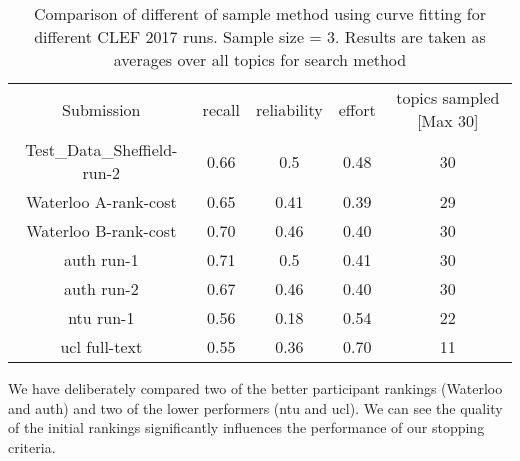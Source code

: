 \begin{table}[H]
\centering
\begin{tabular}{|c|c|c|c|c|} 

 \hline
 Submission & recall & reliability & effort & topics sampled [Max 30]  \\ 
 Test\_Data\_Sheffield-run-2 & 0.66 &	0.5	&	0.48 & 30 \\ 
 Waterloo A-rank-cost & 0.65 & 0.41	&	0.39 & 29 \\ 
 Waterloo B-rank-cost & 0.70 & 0.46	&	0.40 & 30 \\ 
 auth run-1 & 0.71 & 0.5	&	0.41 & 30 \\ 
 auth run-2 & 0.67 & 0.46	&	0.40 & 30 \\ 
 ntu run-1 & 0.56 & 0.18	&	0.54 & 22 \\ 
 ucl full-text & 0.55 & 0.36	&	0.70 & 11 \\ 
 \hline
\end{tabular}
\caption{Comparison of different of sample method using curve fitting for different CLEF 2017 runs. Sample size = 3. Results are taken as averages over all topics for search method}

\end{table}

We have deliberately compared two of the better participant rankings (Waterloo and auth) and two of the lower performers (ntu and ucl). We can see the quality of the initial rankings significantly influences the performance of our stopping criteria.


